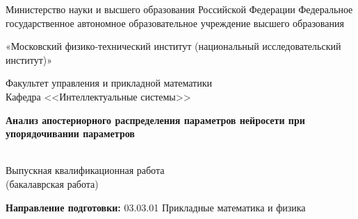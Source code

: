 \begin{titlepage}
    	\begin{center}
        		Министерство науки и высшего образования Российской Федерации Федеральное государственное автономное образовательное учреждение высшего образования
       
		«Московский физико-технический институт (национальный исследовательский институт)»

        		Факультет управления и прикладной математики\\
        		Кафедра <<Интеллектуальные системы>>\\
    	\end{center}

    	\vspace{2cm}

    	\begin{center}
       		\Large \bf Анализ апостериорного распределения параметров нейросети при упорядочивании параметров
    	\end{center}
    
    	\begin{center}
		~\\[-28pt]
		Выпускная квалификационная работа\\
		(бакалаврская работа)
	\end{center}
	
	\vspace{0.1cm}
	    
    \begin{center}
    	\textbf{Направление подготовки:} 03.03.01 Прикладные математика и физика
    \end{center}

   \vspace{0.1cm}


\end{titlepage}
